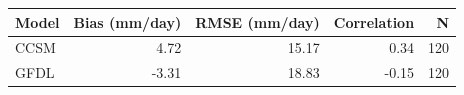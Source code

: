 \begin{tabular}{lrrrr}
\toprule
Model & Bias (mm/day) & RMSE (mm/day) & Correlation & N \\
\midrule
CCSM & 4.72 & 15.17 & 0.34 & 120 \\
GFDL & -3.31 & 18.83 & -0.15 & 120 \\
\bottomrule
\end{tabular}
